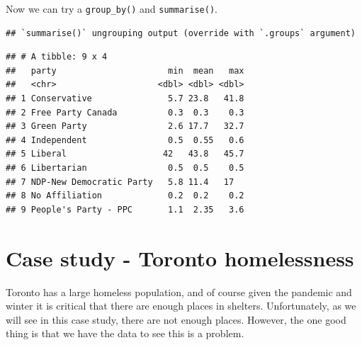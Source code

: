 \documentclass[
]{book}
\newenvironment{Shaded}{\begin{snugshade}}{\end{snugshade}}
\newcommand{\CommentTok}[1]{\textcolor[rgb]{0.56,0.35,0.01}{\textit{#1}}}
\newcommand{\DataTypeTok}[1]{\textcolor[rgb]{0.13,0.29,0.53}{#1}}
\newcommand{\KeywordTok}[1]{\textcolor[rgb]{0.13,0.29,0.53}{\textbf{#1}}}
\newcommand{\NormalTok}[1]{#1}
\newcommand{\OperatorTok}[1]{\textcolor[rgb]{0.81,0.36,0.00}{\textbf{#1}}}
\newcommand{\StringTok}[1]{\textcolor[rgb]{0.31,0.60,0.02}{#1}}
\begin{document}
Now we can try a \texttt{group\_by()} and \texttt{summarise()}.

\begin{Shaded}
\end{Shaded}

\begin{verbatim}
## `summarise()` ungrouping output (override with `.groups` argument)
\end{verbatim}

\begin{verbatim}
## # A tibble: 9 x 4
##   party                      min  mean   max
##   <chr>                    <dbl> <dbl> <dbl>
## 1 Conservative               5.7 23.8   41.8
## 2 Free Party Canada          0.3  0.3    0.3
## 3 Green Party                2.6 17.7   32.7
## 4 Independent                0.5  0.55   0.6
## 5 Liberal                   42   43.8   45.7
## 6 Libertarian                0.5  0.5    0.5
## 7 NDP-New Democratic Party   5.8 11.4   17  
## 8 No Affiliation             0.2  0.2    0.2
## 9 People's Party - PPC       1.1  2.35   3.6
\end{verbatim}

\hypertarget{case-study---toronto-homelessness}{%
\section{Case study - Toronto homelessness}\label{case-study---toronto-homelessness}}

Toronto has a large homeless population, and of course given the pandemic and winter it is critical that there are enough places in shelters. Unfortunately, as we will see in this case study, there are not enough places. However, the one good thing is that we have the data to see this is a problem.
\end{document}
